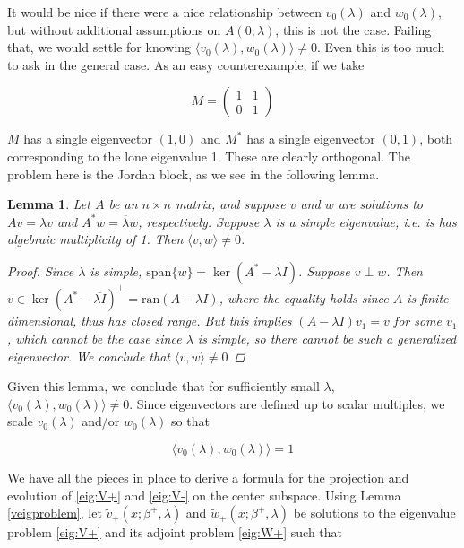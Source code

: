 \documentclass[12pt]{article}
\newtheorem{lemma}{Lemma}
\begin{document}
It would be nice if there were a nice relationship between $v_0(\lambda)$ and $w_0(\lambda)$, but without additional assumptions on $A(0; \lambda)$, this is not the case. Failing that, we would settle for knowing $\langle v_0(\lambda), w_0(\lambda) \rangle \neq 0$. Even this is too much to ask in the general case. As an easy counterexample, if we take

\[
M = \begin{pmatrix}1 & 1 \\ 0 & 1 \end{pmatrix}
\]

$M$ has a single eigenvector $(1, 0)$ and $M^*$ has a single eigenvector $(0, 1)$, both corresponding to the lone eigenvalue 1. These are clearly orthogonal. The problem here is the Jordan block, as we see in the following lemma.


\begin{lemma}\label{perpeigs}
Let $A$ be an $n \times n$ matrix, and suppose $v$ and $w$ are solutions to $Av = \lambda v$ and $A^*w = \overline{\lambda}w$, respectively. Suppose $\lambda$ is a simple eigenvalue, i.e. is has algebraic multiplicity of 1. Then $\langle v, w \rangle \neq 0$.
\begin{proof}
Since $\lambda$ is simple, $\text{span} \{w\} = \ker(A^* - \overline{\lambda}I)$. Suppose $v \perp w$. Then $v \in \ker(A^* - \overline{\lambda I})^\perp = \text{ran}(A - \lambda I)$, where the equality holds since $A$ is finite dimensional, thus has closed range. But this implies $(A - \lambda I)v_1 = v$ for some $v_1$, which cannot be the case since $\lambda$ is simple, so there cannot be such a generalized eigenvector. We conclude that $\langle v, w \rangle \neq 0$
\end{proof}
\end{lemma}

Given this lemma, we conclude that for sufficiently small $\lambda$, $\langle v_0(\lambda), w_0(\lambda) \rangle \neq 0$. Since eigenvectors are defined up to scalar multiples, we scale $v_0(\lambda)$ and/or $w_0(\lambda)$ so that

\[
\langle v_0(\lambda), w_0(\lambda) \rangle = 1
\]
 
We have all the pieces in place to derive a formula for the projection and evolution of \eqref{eig:V+} and \eqref{eig:V-} on the center subspace. Using Lemma \ref{veigproblem}, let $\tilde{v}_+(x; \beta^+, \lambda)$ and $\tilde{w}_+(x; \beta^+, \lambda)$ be solutions to the eigenvalue problem \eqref{eig:V+} and its adjoint problem \eqref{eig:W+} such that
\end{document}
